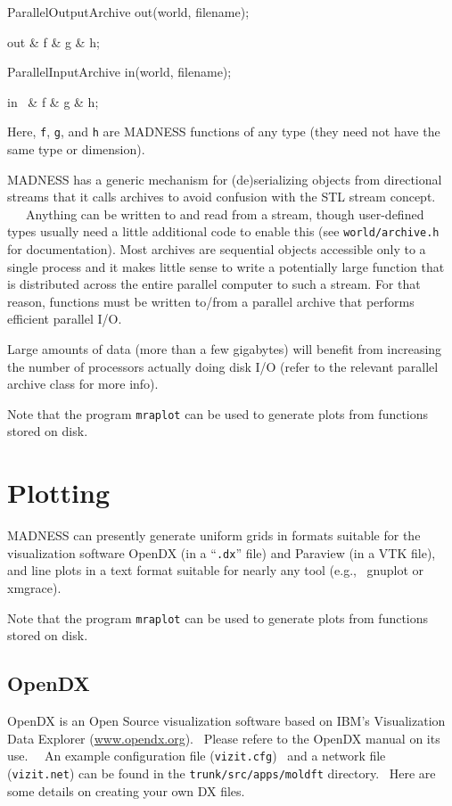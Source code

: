 \documentclass[letterpaper]{article}
\begin{document}
{\ttfamily
ParallelOutputArchive out(world, filename);}

{\ttfamily
out \& f \& g \& h;}

{\ttfamily
ParallelInputArchive in(world, filename);}

{\ttfamily
in \ \& f \& g \& h;}


\bigskip

Here, \texttt{f}, \texttt{g}, and \texttt{h} are MADNESS functions of any type (they need not have the same type or
dimension). 

MADNESS has a generic mechanism for (de)serializing objects from directional streams that it calls archives to avoid
confusion with the STL stream concept. \ \ \ Anything can be written to and read from a stream, though user-defined
types usually need a little additional code to enable this (see \texttt{world/archive.h} for documentation). Most
archives are sequential objects accessible only to a single process and it makes little sense to write a potentially
large function that is distributed across the entire parallel computer to such a stream. For that reason, functions
must be written to/from a parallel archive that performs efficient parallel I/O.

Large amounts of data (more than a few gigabytes) will benefit from increasing the number of processors actually doing
disk I/O (refer to the relevant parallel archive class for more info).

Note that the program \texttt{mraplot} can be used to generate plots from functions stored on disk.

\section{Plotting}
MADNESS can presently generate uniform grids in formats suitable for the visualization software OpenDX (in a
``\texttt{.dx}{}'' file) and Paraview (in a VTK file), and line plots in a text format suitable for nearly any tool
(e.g., \ gnuplot or xmgrace).

Note that the program \texttt{mraplot} can be used to generate plots from functions stored on disk.

\subsection{OpenDX}
OpenDX is an Open Source visualization software based on IBM's Visualization Data Explorer
(\href{http://www.opendx.org/}{www.opendx.org}). \ Please refere to the OpenDX manual on its use. \ \ An example
configuration file (\texttt{vizit.cfg}) \ and a network file (\texttt{vizit.net}) can be found in the
\texttt{trunk/src/apps/moldft} directory. \ Here are some details on creating your own DX files.
\end{document}
